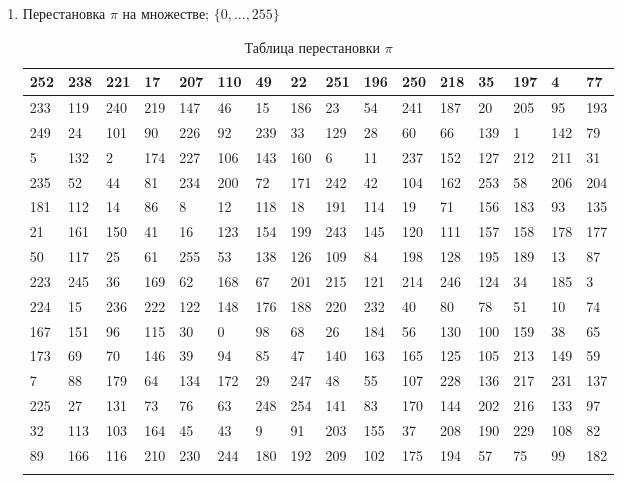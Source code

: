 \documentclass{./civarticle}
\begin{document}
\begin{enumerate}
    \item Перестановка $\pi$ на множестве; $\{0, ..., 255 \}$ \begin{longtable}{|p{0.5cm}|p{0.5cm}|p{0.5cm}|p{0.5cm}|p{0.5cm}|p{0.5cm}|p{0.5cm}|p{0.5cm}|p{0.5cm}|p{0.5cm}|p{0.5cm}|p{0.5cm}|p{0.5cm}|p{0.5cm}|p{0.5cm}|p{0.5cm}|}
    \hline
    252 & 238 & 221 & 17 & 207 & 110 & 49 & 22 & 251 & 196 & 250 & 218 & 35 & 197 & 4 & 77 \\ 
    \hline
    233 & 119 & 240 & 219 & 147 & 46 & 15 & 186 & 23 & 54 & 241 & 187 & 20 & 205 & 95 & 193 \\
    \hline
    249 & 24 & 101 & 90 & 226 & 92 & 239 & 33 & 129 & 28 & 60 & 66 & 139 & 1 & 142 & 79 \\ 
    \hline
    5 & 132 & 2 & 174 & 227 & 106 & 143 & 160 & 6 & 11 & 237 & 152 & 127 & 212 & 211 & 31 \\
    \hline
    235 & 52 & 44 & 81 & 234 & 200 & 72 & 171 & 242 & 42 & 104 & 162 & 253 & 58 & 206 & 204 \\ 
    \hline
    181 & 112 & 14 & 86 & 8 & 12 & 118 & 18 & 191 & 114 & 19 & 71 & 156 & 183 & 93 & 135 \\
    \hline
    21 & 161 & 150 & 41 & 16 & 123 & 154 & 199 & 243 & 145 & 120 & 111 & 157 & 158 & 178 & 177 \\
    \hline
    50 & 117 & 25 & 61 & 255 & 53 & 138 & 126 & 109 & 84 & 198 & 128 & 195 & 189 & 13 & 87 \\
    \hline
    223 & 245 & 36 & 169 & 62 & 168 & 67 & 201 & 215 & 121 & 214 & 246 & 124 & 34 & 185 & 3 \\
    \hline
    224 & 15 & 236 & 222 & 122 & 148 & 176 & 188 & 220 & 232 & 40 & 80 & 78 & 51 & 10 & 74 \\
    \hline
    167 & 151 & 96 & 115 & 30 & 0 & 98 & 68 & 26 & 184 & 56 & 130 & 100 & 159 & 38 & 65 \\
    \hline
    173 & 69 & 70 & 146 & 39 & 94 & 85 & 47 & 140 & 163 & 165 & 125 & 105 & 213 & 149 & 59 \\
    \hline
    7 & 88 & 179 & 64 & 134 & 172 & 29 & 247 & 48 & 55 & 107 & 228 & 136 & 217 & 231 & 137 \\
    \hline
    225 & 27 & 131 & 73 & 76 & 63 & 248 & 254 & 141 & 83 & 170 & 144 & 202 & 216 & 133 & 97 \\
    \hline
    32 & 113 & 103 & 164 & 45 & 43 & 9 & 91 & 203 & 155 & 37 & 208 & 190 & 229 & 108 & 82 \\
    \hline
    89 & 166 & 116 & 210 & 230 & 244 & 180 & 192 & 209 & 102 & 175 & 194 & 57 & 75 & 99 & 182 \\
    \hline
    \caption{Таблица перестановки $\pi$}
    \end{longtable}


\end{enumerate}
\end{document}
